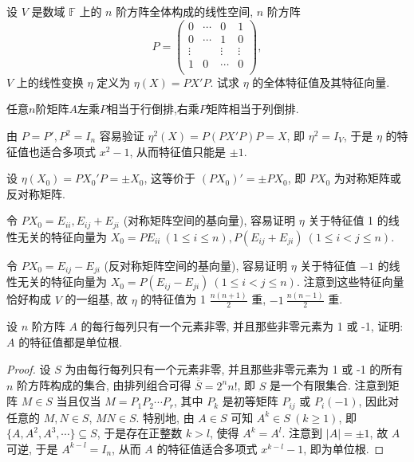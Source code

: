 \documentclass[../../main.tex]{subfiles}%
\begin{document}
\begin{example}
设 \( V \) 是数域 \( \mathbb{F} \) 上的 \( n \) 阶方阵全体构成的线性空间, \( n \) 阶方阵
\[
P=\left( \begin{matrix}
0&		\cdots&		0&		1\\
0&		\cdots&		1&		0\\
\vdots&		&		\vdots&		\vdots\\
1&		0&		\cdots&		0\\
\end{matrix} \right) ,
\]
\( V \) 上的线性变换 \( \eta \) 定义为 \( \eta(X) = PX'P \). 试求 \( \eta \) 的全体特征值及其特征向量.
\end{example}
\begin{note}
任意$n$阶矩阵$A$左乘$P$相当于行倒排,右乘$P$矩阵相当于列倒排.
\end{note}
\begin{solution}

由 \( P = P', P^2 = I_n \) 容易验证 \( \eta^2(X) = P(PX'P)P = X \), 即 \( \eta^2 = I_V \), 于是 \( \eta \) 的特征值也适合多项式 \( x^2 - 1 \), 从而特征值只能是 \( \pm 1 \).

设 \( \eta(X_0) = PX_0'P = \pm X_0 \), 这等价于 \( (PX_0)' = \pm PX_0 \), 即 \( PX_0 \) 为对称矩阵或反对称矩阵. 

令 \( PX_0 = E_{ii}, E_{ij} + E_{ji} \) (对称矩阵空间的基向量), 容易证明 \( \eta \) 关于特征值 1 的线性无关的特征向量为 \( X_0 = PE_{ii} \ (1 \leqslant  i \leqslant  n), P(E_{ij} + E_{ji}) \ (1 \leqslant  i < j \leqslant  n) \).

令 \( PX_0 = E_{ij} - E_{ji} \) (反对称矩阵空间的基向量), 容易证明 \( \eta \) 关于特征值 \( -1 \) 的线性无关的特征向量为 \( X_0 = P(E_{ij} - E_{ji}) \ (1 \leqslant  i < j \leqslant  n) \). 注意到这些特征向量恰好构成 \( V \) 的一组基, 故 \( \eta \) 的特征值为 1 \( \frac{n(n+1)}{2} \) 重, \( -1 \ \frac{n(n-1)}{2} \) 重.

\end{solution}

\begin{example}
设 \( n \) 阶方阵 \( A \) 的每行每列只有一个元素非零, 并且那些非零元素为 1 或 -1, 证明: \( A \) 的特征值都是单位根.
\end{example}
\begin{proof}

设 \( S \) 为由每行每列只有一个元素非零, 并且那些非零元素为 1 或 -1 的所有 \( n \) 阶方阵构成的集合, 由排列组合可得 \( \overline{\overline{S}} = 2^n n! \), 即 \( S \) 是一个有限集合. 注意到矩阵 \( M \in S \) 当且仅当 \( M = P_1 P_2 \cdots P_r \), 其中 \( P_k \) 是初等矩阵 \( P_{ij} \) 或 \( P_i(-1) \), 因此对任意的 \( M, N \in S \), \( MN \in S \). 特别地, 由 \( A \in S \) 可知 \( A^k \in S \ (k \geqslant  1) \), 即 \( \{A, A^2, A^3, \cdots\} \subseteq S \), 于是存在正整数 \( k > l \), 使得 \( A^k = A^l \). 注意到 \( |A| = \pm 1 \), 故 \( A \) 可逆, 于是 \( A^{k-l} = I_n \), 从而 \( A \) 的特征值适合多项式 \( x^{k-l} - 1 \), 即为单位根.

\end{proof}
\end{document}

